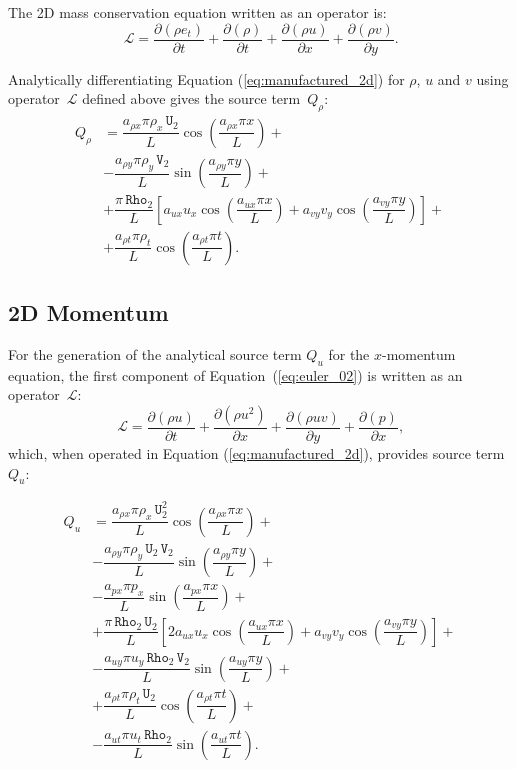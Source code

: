 \documentclass[10pt]{article}
\newcommand{\Diff}[2] {\dfrac{\partial( #1)}{\partial #2}}
\newcommand{\Rho}{\,\mathtt{Rho}}
\newcommand{\U}{\,\mathtt{U}}
\newcommand{\V}{\,\mathtt{V}}
\newcommand{\Lo}{\,\mathcal{L}}
\begin{document}
The 2D mass conservation equation written as an operator is:
\begin{equation*}
 \Lo=\Diff{\rho e_t}{t} +  \Diff{\rho}{t} +\Diff{\rho u}{x}+\Diff{\rho v}{y}.
\end{equation*}

Analytically differentiating Equation (\ref{eq:manufactured_2d}) for $\rho$, $u$ and $v$ using operator $\Lo$ defined above gives  the source term~$Q_{\rho}$:
\begin{equation}
 \begin{split}
Q_\rho &= \dfrac{a_{\rho x} \pi \rho_x \U_2 }{L}\cos\left(\dfrac{a_{\rho x} \pi x}{L}\right)+\\
&-\dfrac{a_{\rho y} \pi \rho_y \V_2 }{L}\sin\left(\dfrac{a_{\rho y} \pi y}{L}\right)+\\
&+\dfrac{\pi \Rho_2}{L}\left[a_{ux} u_x \cos\left(\dfrac{a_{ux} \pi x}{L}\right)+a_{vy} v_y  \cos\left(\dfrac{a_{vy} \pi y}{L}\right)\right]+\\
&+  \dfrac{a_{\rho t} \pi \rho_t }{L}\cos\left(\dfrac{a_{\rho t} \pi t}{L}\right).
 \end{split}
\end{equation}

\subsection{2D Momentum}

For the generation of the analytical source term $Q_u$ for the $x$-momentum equation, the first component of Equation~(\ref{eq:euler_02}) is written as an  operator $\Lo$:
\begin{equation*}
 \Lo= \Diff{\rho u}{t} + \Diff{\rho u^2}{x}+\Diff{\rho uv}{y} + \Diff{p}{x},
\end{equation*}
which, when operated in Equation (\ref{eq:manufactured_2d}), provides source term $Q_{u}$:

\begin{equation}
 \begin{split}
Q_u &=  \dfrac{a_{\rho x} \pi \rho_x \U_2^2}{L}\cos\left(\dfrac{a_{\rho x} \pi x}{L}\right)+\\
&- \dfrac{a_{\rho y} \pi \rho_y \U_2 \V_2}{L}\sin\left(\dfrac{a_{\rho y} \pi y}{L}\right)+\\
&-\dfrac{a_{px} \pi p_x }{L}\sin\left(\dfrac{a_{px} \pi x}{L}\right)+\\
&+\dfrac{\pi \Rho_2 \U_2}{L}\left[2 a_{ux} u_x \cos\left(\dfrac{a_{ux} \pi x}{L}\right)+a_{vy} v_y  \cos\left(\dfrac{a_{vy} \pi y}{L}\right)\right]+\\
&-\dfrac{a_{uy} \pi u_y \Rho_2 \V_2 }{L}\sin\left(\dfrac{a_{uy} \pi y}{L}\right)+\\
&+  \dfrac{a_{\rho t} \pi \rho_t \U_2 }{L}\cos\left(\dfrac{a_{\rho t} \pi t}{L}\right)+\\
&-\dfrac{a_{ut} \pi u_t \Rho_2 }{L}\sin\left(\dfrac{a_{ut} \pi t}{L}\right).
 \end{split}
\end{equation}
\end{document}
